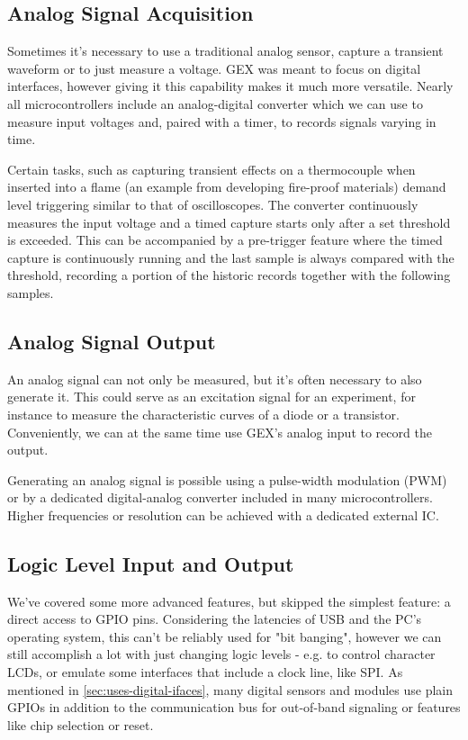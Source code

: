 \subsection{Analog Signal Acquisition}

Sometimes it's necessary to use a traditional analog sensor, capture a transient waveform or to just measure a voltage. GEX was meant to focus on digital interfaces, however giving it this capability makes it much more versatile. Nearly all microcontrollers include an analog-digital converter which we can use to measure input voltages and, paired with a timer, to records signals varying in time.

Certain tasks, such as capturing transient effects on a thermocouple when inserted into a flame (an example from developing fire-proof materials) demand level triggering similar to that of oscilloscopes. The converter continuously measures the input voltage and a timed capture starts only after a set threshold is exceeded. This can be accompanied by a pre-trigger feature where the timed capture is continuously running and the last sample is always compared with the threshold, recording a portion of the historic records together with the following samples.

\subsection{Analog Signal Output}

An analog signal can not only be measured, but it's often necessary to also generate it. This could serve as an excitation signal for an experiment, for instance to measure the characteristic curves of a diode or a transistor. Conveniently, we can at the same time use GEX's analog input to record the output.

Generating an analog signal is possible using a pulse-width modulation (PWM) or by a dedicated digital-analog converter included in many microcontrollers. Higher frequencies or resolution can be achieved with a dedicated external IC.

\subsection{Logic Level Input and Output}

We've covered some more advanced features, but skipped the simplest feature: a direct access to GPIO pins. Considering the latencies of USB and the PC's operating system, this can't be reliably used for "bit banging", however we can still accomplish a lot with just changing logic levels - e.g. to control character LCDs, or emulate some interfaces that include a clock line, like SPI. As mentioned in \ref{sec:uses-digital-ifaces}, many digital sensors and modules use plain GPIOs in addition to the communication bus for out-of-band signaling or features like chip selection or reset.

